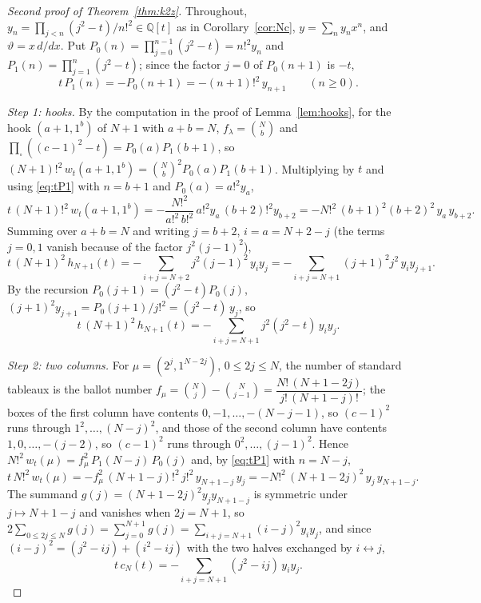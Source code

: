 \documentclass[11pt]{article}
\theoremstyle{definition}
\theoremstyle{remark}
\begin{document}
\begin{proof}[Second proof of Theorem~\ref{thm:k2z}]
Throughout, $y_n=\prod_{j<n}(j^2-t)/n!^2\in\mathbb Q[t]$ as in Corollary~\ref{cor:Nc}, $y=\sum_ny_nx^n$, and $\vartheta=x\,d/dx$. Put $P_0(n)=\prod_{j=0}^{n-1}(j^2-t)=n!^2y_n$ and $P_1(n)=\prod_{j=1}^{n}(j^2-t)$; since the factor $j=0$ of $P_0(n+1)$ is $-t$,
\begin{equation}\label{eq:tP1}
t\,P_1(n)=-P_0(n+1)=-(n+1)!^2\,y_{n+1}\qquad(n\ge0).
\end{equation}

\emph{Step 1: hooks.} By the computation in the proof of Lemma~\ref{lem:hooks}, for the hook $(a+1,1^b)$ of $N+1$ with $a+b=N$, $f_\lambda=\binom Nb$ and $\prod_\square((c-1)^2-t)=P_0(a)P_1(b+1)$, so $(N+1)!^2\,w_t(a+1,1^b)=\binom Nb^2P_0(a)P_1(b+1)$. Multiplying by $t$ and using \eqref{eq:tP1} with $n=b+1$ and $P_0(a)=a!^2y_a$,
\[
t\,(N+1)!^2\,w_t(a+1,1^b)=-\frac{N!^2}{a!^2\,b!^2}\,a!^2y_a\,(b+2)!^2y_{b+2}=-N!^2\,(b+1)^2(b+2)^2\,y_a\,y_{b+2}.
\]
Summing over $a+b=N$ and writing $j=b+2$, $i=a=N+2-j$ (the terms $j=0,1$ vanish because of the factor $j^2(j-1)^2$),
\begin{equation}\label{eq:hookconv}
t\,(N+1)^2\,h_{N+1}(t)=-\sum_{i+j=N+2}j^2(j-1)^2\,y_iy_j
=-\sum_{i+j=N+1}(j+1)^2j^2\,y_iy_{j+1}.
\end{equation}
By the recursion $P_0(j+1)=(j^2-t)P_0(j)$, $(j+1)^2y_{j+1}=P_0(j+1)/j!^2=(j^2-t)\,y_j$, so
\begin{equation}\label{eq:hookconv2}
t\,(N+1)^2\,h_{N+1}(t)=-\sum_{i+j=N+1}j^2(j^2-t)\,y_iy_j .
\end{equation}

\emph{Step 2: two columns.} For $\mu=(2^j,1^{N-2j})$, $0\le2j\le N$, the number of standard tableaux is the ballot number $f_\mu=\binom Nj-\binom N{j-1}=\dfrac{N!\,(N+1-2j)}{j!\,(N+1-j)!}$; the boxes of the first column have contents $0,-1,\dots,-(N-j-1)$, so $(c-1)^2$ runs through $1^2,\dots,(N-j)^2$, and those of the second column have contents $1,0,\dots,-(j-2)$, so $(c-1)^2$ runs through $0^2,\dots,(j-1)^2$. Hence $N!^2\,w_t(\mu)=f_\mu^2\,P_1(N-j)\,P_0(j)$ and, by \eqref{eq:tP1} with $n=N-j$,
\[
t\,N!^2\,w_t(\mu)=-f_\mu^2\,(N+1-j)!^2\,j!^2\,y_{N+1-j}\,y_j=-N!^2\,(N+1-2j)^2\,y_j\,y_{N+1-j}.
\]
The summand $g(j)=(N+1-2j)^2y_jy_{N+1-j}$ is symmetric under $j\mapsto N+1-j$ and vanishes when $2j=N+1$, so $2\sum_{0\le2j\le N}g(j)=\sum_{j=0}^{N+1}g(j)=\sum_{i+j=N+1}(i-j)^2y_iy_j$, and since $(i-j)^2=(j^2-ij)+(i^2-ij)$ with the two halves exchanged by $i\leftrightarrow j$,
\begin{equation}\label{eq:twocolconv}
t\,c_N(t)=-\sum_{i+j=N+1}(j^2-ij)\,y_iy_j .
\end{equation}


\end{proof}
\end{document}
